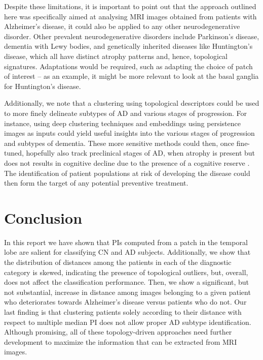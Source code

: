 \documentclass{article}
\begin{document}
Despite these limitations, it is important to point out that the approach outlined here was specifically aimed at analysing  MRI images obtained from patients with Alzheimer's disease, it could also be applied to any other neurodegenerative disorder. Other prevalent neurodegenerative disorders include Parkinson's disease, dementia with Lewy bodies, and genetically inherited diseases like Huntington's disease, which all have distinct atrophy patterns and, hence, topological signatures. Adaptations would be required, such as adapting the choice of patch of interest -- as an example, it might be more relevant to look at the basal ganglia for Huntington's disease.

Additionally, we note that a clustering using topological descriptors could be used to more finely delineate subtypes of AD and various stages of progression. For instance, using deep clustering techniques and embeddings using persistence images as inputs could yield useful insights into the various stages of progression and subtypes of dementia. These more sensitive methods could then, once fine-tuned, hopefully also track preclinical stages of AD, when atrophy is present but does not results in cognitive decline due to the presence of a cognitive reserve \citep{scarmeas2004cognitive, van2017neuroimaging}. The identification of patient populations at risk of developing the disease could then form the target of any potential preventive treatment.

\section{Conclusion}

In this report we have shown that PIs computed from a patch in the temporal lobe are salient for classifying CN and AD subjects. Additionally, we show that the distribution of distances among the patients in each of the diagnostic category is skewed, indicating the presence of topological outliers, but, overall, does not affect the classification performance. Then, we show a significant, but not substantial, increase in distance among images belonging to a given patient who deteriorates towards Alzheimer's disease versus patients who do not. Our last finding is that clustering patients solely according to their distance with respect to multiple median PI does not allow proper AD subtype identification. Although promising, all of these topology-driven approaches need further development to maximize the information that can be extracted from MRI images.
\end{document}
